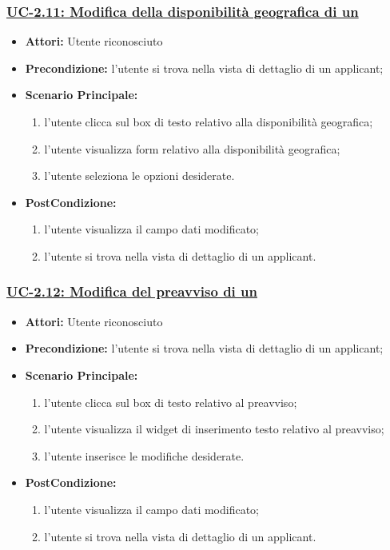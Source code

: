 \subsubsection{\underline{UC-2.11: Modifica della disponibilità geografica di un \applicant}}
\begin{itemize}
	\item \textbf{Attori:} Utente riconosciuto
	\item \textbf{Precondizione:}  l'utente si trova nella vista di dettaglio di un applicant;
	\item \textbf{Scenario Principale:}
	\begin{enumerate}
		\item l'utente clicca sul box di testo relativo alla disponibilità geografica;
		\item l'utente visualizza form relativo alla disponibilità geografica;
		\item l'utente seleziona le opzioni desiderate.
	\end{enumerate}
	\item \textbf{PostCondizione:} 
	\begin{enumerate}
		\item l'utente visualizza il campo dati modificato;
		\item l'utente si trova nella vista di dettaglio di un applicant.
	\end{enumerate}
	
\end{itemize}

\subsubsection{\underline{UC-2.12: Modifica del preavviso di un \applicant}}
\begin{itemize}
	\item \textbf{Attori:} Utente riconosciuto
	\item \textbf{Precondizione:}  l'utente si trova nella vista di dettaglio di un applicant;
	\item \textbf{Scenario Principale:}
	\begin{enumerate}
		\item l'utente clicca sul box di testo relativo al preavviso;
		\item l'utente visualizza il  widget di inserimento testo relativo al preavviso;
		\item l'utente inserisce le modifiche desiderate.
	\end{enumerate}
	\item \textbf{PostCondizione:} 
	\begin{enumerate}
		\item l'utente visualizza il campo dati modificato;
		\item l'utente si trova nella vista di dettaglio di un applicant.
	\end{enumerate}
	
\end{itemize}

